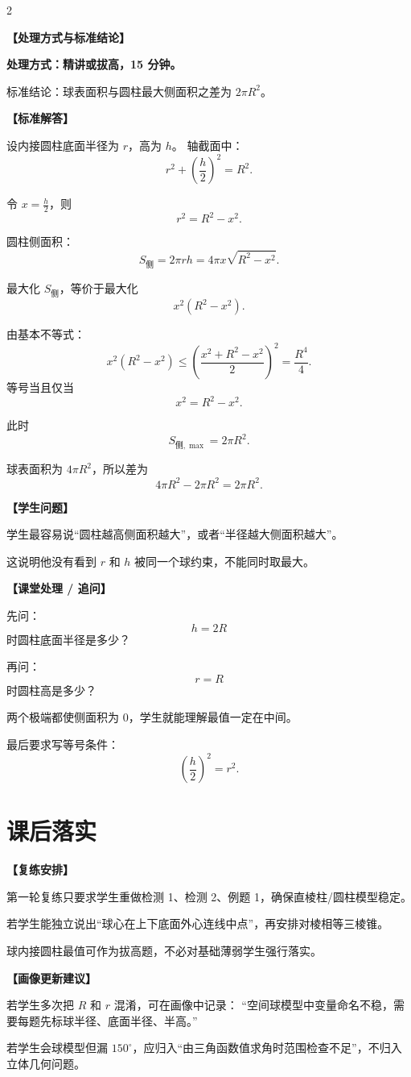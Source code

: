 \documentclass[11pt,a4paper]{ctexart}
\providecommand{\teachblock}[2]{%
  \par\addvspace{0.55em}%
  \noindent\textbf{【#1】}\par\nobreak
  \begingroup
    \raggedright
    \setlength{\parskip}{0.35em}%
    #2\par
  \endgroup
}
\begin{document}
\begin{paracol}{2}
\teachblock{处理方式与标准结论}{
  \textbf{处理方式：精讲或拔高，15 分钟。}

  标准结论：球表面积与圆柱最大侧面积之差为 $2\pi R^2$。
}

\teachblock{标准解答}{
  设内接圆柱底面半径为 $r$，高为 $h$。
  轴截面中：
  \[
    r^2+\left(\frac h2\right)^2=R^2.
  \]

  令 $x=\frac h2$，则
  \[
    r^2=R^2-x^2.
  \]

  圆柱侧面积：
  \[
    S_{\text{侧}}=2\pi rh
    =
    4\pi x\sqrt{R^2-x^2}.
  \]

  最大化 $S_{\text{侧}}$，等价于最大化
  \[
    x^2(R^2-x^2).
  \]

  由基本不等式：
  \[
    x^2(R^2-x^2)
    \le
    \left(\frac{x^2+R^2-x^2}{2}\right)^2
    =
    \frac{R^4}{4}.
  \]
  等号当且仅当
  \[
    x^2=R^2-x^2.
  \]

  此时
  \[
    S_{\text{侧},\max}=2\pi R^2.
  \]

  球表面积为 $4\pi R^2$，所以差为
  \[
    4\pi R^2-2\pi R^2=2\pi R^2.
  \]
}

\switchcolumn
\teachblock{学生问题}{
  学生最容易说“圆柱越高侧面积越大”，或者“半径越大侧面积越大”。

  这说明他没有看到 $r$ 和 $h$ 被同一个球约束，不能同时取最大。
}

\teachblock{课堂处理 / 追问}{
  先问：
  \[
    h=2R
  \]
  时圆柱底面半径是多少？

  再问：
  \[
    r=R
  \]
  时圆柱高是多少？

  两个极端都使侧面积为 $0$，学生就能理解最值一定在中间。

  最后要求写等号条件：
  \[
    \left(\frac h2\right)^2=r^2.
  \]
}
\end{paracol}

\section{课后落实}

\teachblock{复练安排}{
  第一轮复练只要求学生重做检测 1、检测 2、例题 1，确保直棱柱/圆柱模型稳定。

  若学生能独立说出“球心在上下底面外心连线中点”，再安排对棱相等三棱锥。

  球内接圆柱最值可作为拔高题，不必对基础薄弱学生强行落实。
}

\teachblock{画像更新建议}{
  若学生多次把 $R$ 和 $r$ 混淆，可在画像中记录：
  “空间球模型中变量命名不稳，需要每题先标球半径、底面半径、半高。”

  若学生会球模型但漏 $150^\circ$，应归入“由三角函数值求角时范围检查不足”，不归入立体几何问题。
}
\end{document}
